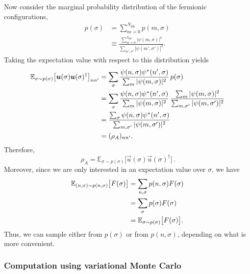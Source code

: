 \documentclass[../../main.tex]{subfiles}
\begin{document}
Now consider the marginal probability distribution of the fermionic
configurations,
\begin{align}
p(\sigma) &=
\sum_{m=0}^{N_{\mathrm{ph}}} p(m, \sigma) \\
&\equiv \frac{\sum_{m=0}^{N_{\mathrm{ph}}}|\psi(m,\sigma)|^2}
{\sum_{m',\sigma'}|\psi(m',\sigma')|^2} .
\end{align}
Taking the expectation value with respect to this distribution yields
\begin{align}
\mathbb E_{\sigma\sim p(\sigma)}
\bigl[\vec u(\sigma)\vec u(\sigma)^\dagger\bigr]_{nn'}
&=\sum_\sigma
  \frac{\psi(n,\sigma)\psi^*(n',\sigma)}
       {\sum_m|\psi(m,\sigma)|^2}\,p(\sigma)\notag\\
&=\sum_\sigma
  \frac{\psi(n,\sigma)\psi^*(n',\sigma)}
       {\sum_m|\psi(m,\sigma)|^2}\,
  \frac{\sum_m|\psi(m,\sigma)|^2}
       {\sum_{m,\sigma'}|\psi(m,\sigma')|^2}\notag\\
&=\frac{\sum_\sigma\psi(n,\sigma)\psi^*(n',\sigma)}
       {\sum_{m,\sigma'}|\psi(m,\sigma')|^2}\notag\\
&=(\rho_A)_{nn'}.
\end{align}
Therefore,
\begin{equation}
\boxed{\,
\rho_A=
\mathbb E_{\sigma\sim p(\sigma)}
\bigl[\vec u(\sigma)\vec u(\sigma)^\dagger\bigr]
\,}.
\end{equation}
Moreover, since we are only interested in an expectation value over $\sigma$, we have
\begin{align}
\mathbb E_{(n,\sigma)\sim p(n, \sigma)}
\bigl[F(\sigma)\bigr]
&=\sum_{n,\sigma}
  p(n, \sigma) F(\sigma) \notag\\
&=\sum_{\sigma}
  p(\sigma) F(\sigma) \notag\\
&= \mathbb E_{\sigma\sim p(\sigma)}
\bigl[F(\sigma)\bigr] . \label{eq:expectation_value_equal_probability_marginal_probability}
\end{align}
Thus, we can sample either from $p(\sigma)$ or from $p(n,\sigma)$, depending on what is more convenient.

\subsubsection{Computation using variational Monte Carlo}
\end{document}
